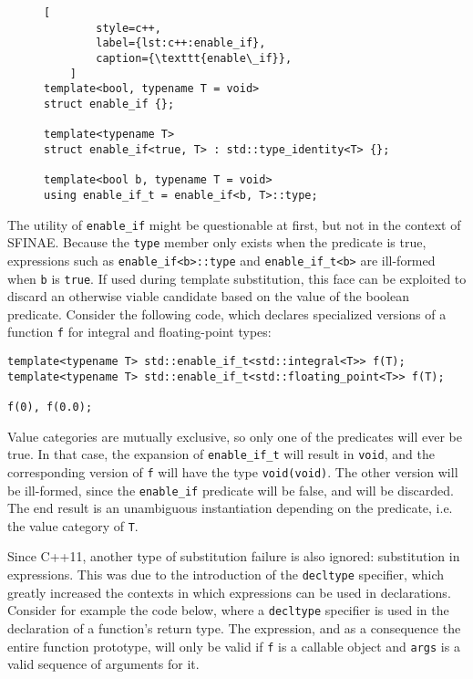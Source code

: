 \begin{figure}[ht]
    \begin{lstlisting}[
        style=c++,
        label={lst:c++:enable_if},
        caption={\texttt{enable\_if}},
    ]
template<bool, typename T = void>
struct enable_if {};

template<typename T>
struct enable_if<true, T> : std::type_identity<T> {};

template<bool b, typename T = void>
using enable_if_t = enable_if<b, T>::type;
    \end{lstlisting}
\end{figure}

The utility of \texttt{enable\_if} might be questionable at first, but not in
the context of SFINAE.  Because the \texttt{type} member only exists when the
predicate is true, expressions such as \texttt{enable\_if<b>::type} and
\texttt{enable\_if\_t<b>} are ill-formed when \texttt{b} is \texttt{true}.  If
used during template substitution, this face can be exploited to discard an
otherwise viable candidate based on the value of the boolean predicate.
Consider the following code, which declares specialized versions of a function
\texttt{f} for integral and floating-point types:

\begin{lstlisting}[style=c++]
template<typename T> std::enable_if_t<std::integral<T>> f(T);
template<typename T> std::enable_if_t<std::floating_point<T>> f(T);

f(0), f(0.0);
\end{lstlisting}

Value categories are mutually exclusive, so only one of the predicates will ever
be true.  In that case, the expansion of \texttt{enable\_if\_t} will result in
\texttt{void}, and the corresponding version of \texttt{f} will have the type
\texttt{void(void)}.  The other version will be ill-formed, since the
\texttt{enable\_if} predicate will be false, and will be discarded.  The end
result is an unambiguous instantiation depending on the predicate, i.e. the
value category of \texttt{T}.

Since C++11, another type of substitution failure is also ignored: substitution
in expressions.  This was due to the introduction of the \texttt{decltype}
specifier, which greatly increased the contexts in which expressions can be used
in declarations.  Consider for example the code below, where a \texttt{decltype}
specifier is used in the declaration of a function's return type.  The
expression, and as a consequence the entire function prototype, will only be
valid if \texttt{f} is a callable object and \texttt{args} is a valid sequence
of arguments for it.

